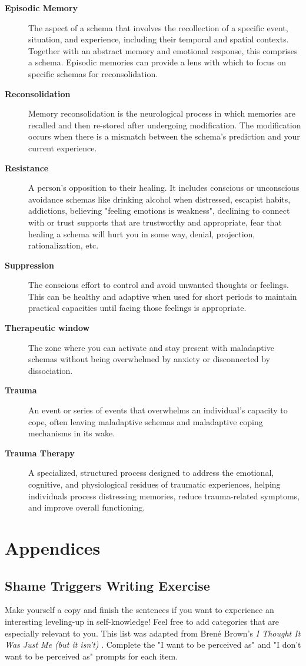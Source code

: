 \documentclass[12pt,letterpaper]{article}
\begin{document}
\begin{description}
    \item[\textbf{Episodic Memory}] The aspect of a schema that involves the recollection of a specific event, situation, and experience, including their temporal and spatial contexts. Together with an abstract memory and emotional response, this comprises a schema. Episodic memories can provide a lens with which to focus on specific schemas for reconsolidation.
    \item[\textbf{Reconsolidation}] Memory reconsolidation is the neurological process in which memories are recalled and then re-stored after undergoing modification. The modification occurs when there is a mismatch between the schema's prediction and your current experience.
    \item[\textbf{Resistance}] A person's opposition to their healing. It includes conscious or unconscious avoidance schemas like drinking alcohol when distressed, escapist habits, addictions, believing "feeling emotions is weakness", declining to connect with or trust supports that are trustworthy and appropriate, fear that healing a schema will hurt you in some way, denial, projection, rationalization, etc.
    \item[\textbf{Suppression}] The conscious effort to control and avoid unwanted thoughts or feelings. This can be healthy and adaptive when used for short periods to maintain practical capacities until facing those feelings is appropriate.
    \item[\textbf{Therapeutic window}] The zone where you can activate and stay present with maladaptive schemas without being overwhelmed by anxiety or disconnected by dissociation.
    \item[\textbf{Trauma}] An event or series of events that overwhelms an individual's capacity to cope, often leaving maladaptive schemas and maladaptive coping mechanisms in its wake.
    \item[\textbf{Trauma Therapy}] A specialized, structured process designed to address the emotional, cognitive, and physiological residues of traumatic experiences, helping individuals process distressing memories, reduce trauma-related symptoms, and improve overall functioning.
\end{description}
\appendix
\section{Appendices}
\subsection{Shame Triggers Writing Exercise}
\label{sec:shametriggers}
Make yourself a copy and finish the sentences if you want to experience an interesting leveling-up in self-knowledge! Feel free to add categories that are especially relevant to you. This list was adapted from Brené Brown's \textit{I Thought It Was Just Me (but it isn't)} \cite{brownThought}. Complete the "I want to be perceived as" and "I don't want to be perceived as" prompts for each item.
\end{document}
